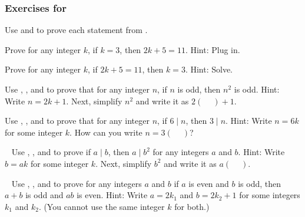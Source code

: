 
\subsubsection*{Exercises for  \subpffifthen}

\begin{exer}[\exerP] %
\label{exer_prove_cond_true}
    Use  and  to prove each statement from . %
    \begin{exerpart}
        \item Prove for any integer $k$, if $k=3$, then $2k+5 = 11$.  Hint: Plug in.
        \item Prove for any integer $k$, if $2k+5 = 11$, then $k=3$.  Hint: Solve.
    \end{exerpart}
\end{exer}

\begin{exer}[\exerP] %
\label{exer_odd_sq_is_odd}
    Use ,  , and  to prove that for any integer $n$, if $n$ is odd, then $n^2$ is odd. Hint: Write $n=2k+1$.  Next, simplify $n^2$ and write it as $2(\quad~)+1$.
\end{exer}

\begin{exer}[\exerP] %
\label{exer_mult6_is_mult3}
    Use , , and  to prove that for any integer $n$, if $6 \mid n$, then $3 \mid n$. Hint: Write $n = 6k$ for some integer $k$.  How can you write $n = 3(\quad~)$?
\end{exer}

\begin{exer}[\exerP] %
\label{exer_divides_square_proof}
~
    Use , , and  to prove if $a \mid b$, then $a \mid b^2$ for any integers $a$ and $b$.  Hint: Write $b = ak$ for some integer $k$.  Next, simplify $b^2$ and write it as $a(\quad~)$.
\end{exer}

\begin{exer}[\exerU] %
\label{exer_proof_sums_prod_even_odd}
~
    Use , , and  to prove for any integers $a$ and $b$ if $a$ is even and $b$ is odd, then $a+b$ is odd and $ab$ is even.  Hint:  Write $a = 2k_1$ and $b = 2k_2+1$ for some integers $k_1$ and $k_2$. (You cannot use the same integer $k$ for both.)
\end{exer}

